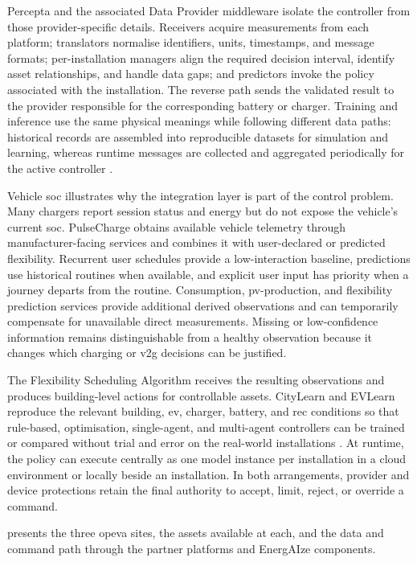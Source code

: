 Percepta and the associated Data Provider middleware isolate the controller from those provider-specific details. Receivers acquire measurements from each platform; translators normalise identifiers, units, timestamps, and message formats; per-installation managers align the required decision interval, identify asset relationships, and handle data gaps; and predictors invoke the policy associated with the installation. The reverse path sends the validated result to the provider responsible for the corresponding battery or charger. Training and inference use the same physical meanings while following different data paths: historical records are assembled into reproducible datasets for simulation and learning, whereas runtime messages are collected and aggregated periodically for the active controller \parencite{fonseca2025realworldrec,opeva2026d63}.

Vehicle \gls{soc} illustrates why the integration layer is part of the control problem. Many chargers report session status and energy but do not expose the vehicle's current \gls{soc}. PulseCharge obtains available vehicle telemetry through manufacturer-facing services and combines it with user-declared or predicted flexibility. Recurrent user schedules provide a low-interaction baseline, predictions use historical routines when available, and explicit user input has priority when a journey departs from the routine. Consumption, \gls{pv}-production, and flexibility prediction services provide additional derived observations and can temporarily compensate for unavailable direct measurements. Missing or low-confidence information remains distinguishable from a healthy observation because it changes which charging or \gls{v2g} decisions can be justified.

The Flexibility Scheduling Algorithm receives the resulting observations and produces building-level actions for controllable assets. CityLearn and EVLearn reproduce the relevant building, \gls{ev}, charger, battery, and \gls{rec} conditions so that rule-based, optimisation, single-agent, and multi-agent controllers can be trained or compared without trial and error on the real-world installations \parencite{fonseca2024energAIze,fonseca2025evlearn}. At runtime, the policy can execute centrally as one model instance per installation in a cloud environment or locally beside an installation. In both arrangements, provider and device protections retain the final authority to accept, limit, reject, or override a command.

 presents the three \gls{opeva} sites, the assets available at each, and the data and command path through the partner platforms and EnergAIze components.

